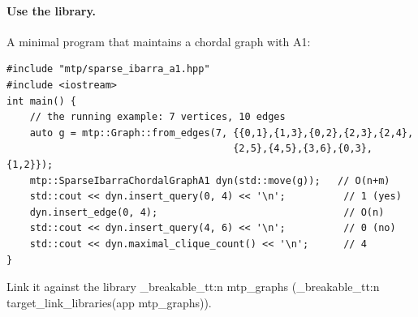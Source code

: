 \documentclass[11pt,a4paper,oneside]{report}
\theoremstyle{plain}
\theoremstyle{definition}
\theoremstyle{remark}
\DeclareRobustCommand{\code}[1]{\mtp_breakable_tt:n {#1}}
\begin{document}
\paragraph{Use the library.} A minimal program that maintains a chordal graph with A1:
\begin{lstlisting}[style=cpp,numbers=none]
#include "mtp/sparse_ibarra_a1.hpp"
#include <iostream>
int main() {
    // the running example: 7 vertices, 10 edges
    auto g = mtp::Graph::from_edges(7, {{0,1},{1,3},{0,2},{2,3},{2,4},
                                       {2,5},{4,5},{3,6},{0,3},{1,2}});
    mtp::SparseIbarraChordalGraphA1 dyn(std::move(g));   // O(n+m)
    std::cout << dyn.insert_query(0, 4) << '\n';          // 1 (yes)
    dyn.insert_edge(0, 4);                                // O(n)
    std::cout << dyn.insert_query(4, 6) << '\n';          // 0 (no)
    std::cout << dyn.maximal_clique_count() << '\n';      // 4
}
\end{lstlisting}
Link it against the library \code{mtp_graphs} (\code{target_link_libraries(app mtp_graphs)}).

\end{document}
